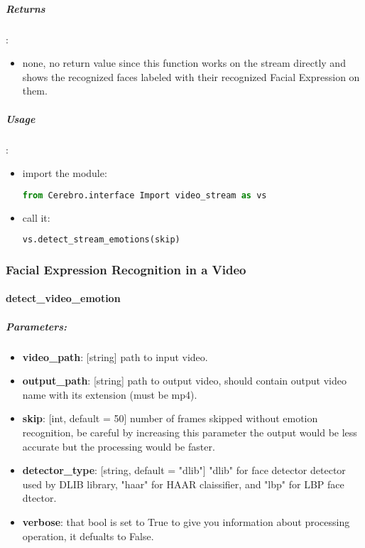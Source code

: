 \subparagraph{Returns}:
\begin{changemargin}{0.5cm}{0cm}
\begin{itemize}
	\item none, no return value since this function works on the stream directly and shows the recognized faces labeled with their recognized Facial Expression on them.
\end{itemize}
\end{changemargin}
		
\subparagraph{Usage}:
\begin{changemargin}{0.5cm}{0cm}
\begin{itemize}
	\item import the module:
	\begin{lstlisting}[language=Python]
	from Cerebro.interface Import video_stream as vs\end{lstlisting}
	\item call it:
	\begin{lstlisting}[language=Python]
	vs.detect_stream_emotions(skip)\end{lstlisting}
\end{itemize}
\end{changemargin}
\hrulefill


\subsubsection{Facial Expression Recognition in a Video}
\paragraph{detect\_video\_emotion}
\subparagraph{Parameters:}
\begin{changemargin}{0.5cm}{0cm} 
	\begin{itemize}
		\item  \textbf{video\_path}: [string] path to input video.
		\item  \textbf{output\_path}: [string] path to output video, should contain output video name with its extension (must be mp4).
		\item  \textbf{skip}: [int, default = 50] number of frames skipped without emotion recognition, be careful by increasing this parameter the output would be less accurate but the processing would be faster.
		\item \textbf{detector\_type}: [string, default = "dlib"] "dlib" for face detector detector used by DLIB library, "haar" for HAAR claissifier, and "lbp" for LBP face dtector.
		\item  \textbf{verbose}: that bool is set to True to give you information about processing operation, it defualts to False.
	\end{itemize}
\end{changemargin}

